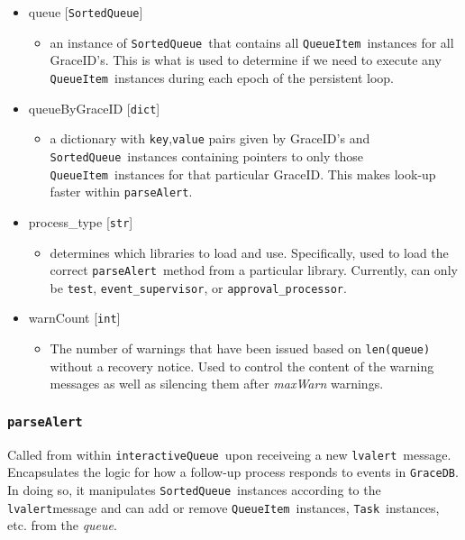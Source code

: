 \documentclass{article}
\newcommand{\GraceDB}{\texttt{GraceDB}}
\newcommand{\alert}{\texttt{lvalert}}
\newcommand{\interactiveQueue}{\texttt{interactiveQueue}}
\newcommand{\parseAlert}{\texttt{parseAlert}}
\newcommand{\SortedQueue}{\texttt{SortedQueue}}
\newcommand{\QueueItem}{\texttt{QueueItem}}
\newcommand{\Task}{\texttt{Task}}
\newcommand{\approvalProcessor}{\texttt{approval\_processor}}
\newcommand{\eventSupervisor}{\texttt{event\_supervisor}}
\newcommand{\pythonint}{\texttt{int}}
\newcommand{\pythonstr}{\texttt{str}}
\newcommand{\pythondict}{\texttt{dict}}
\begin{document}
\begin{itemize}
    \item{queue [\SortedQueue]
        \begin{itemize}
            \item{an instance of \SortedQueue~that contains all \QueueItem~instances for all GraceID's. This is what is used to determine if we need to execute any \QueueItem~instances during each epoch of the persistent loop.}
        \end{itemize}
         }
    \item{queueByGraceID [\pythondict]
        \begin{itemize}
            \item{a dictionary with \texttt{key},\texttt{value} pairs given by GraceID's and \SortedQueue~instances containing pointers to only those \QueueItem~instances for that particular GraceID. This makes look-up faster within \parseAlert.}
        \end{itemize}
         }
    \item{process\_type [\pythonstr]
        \begin{itemize}
            \item{determines which libraries to load and use. Specifically, used to load the correct \parseAlert~method from a particular library. Currently, can only be \texttt{test}, \eventSupervisor, or \approvalProcessor.}
        \end{itemize}
         }
    \item{warnCount [\pythonint]
        \begin{itemize}
            \item{The number of warnings that have been issued based on \texttt{len(queue)} without a recovery notice. Used to control the content of the warning messages as well as silencing them after \textit{maxWarn} warnings.}
        \end{itemize}
         }
\end{itemize}


\subsubsection{\parseAlert}
\label{sec: parseAlert}

Called from within \interactiveQueue~upon receiveing a new \alert~message.
Encapsulates the logic for how a follow-up process responds to events in \GraceDB.
In doing so, it manipulates \SortedQueue~instances according to the \alert message and can add or remove \QueueItem~instances, \Task~instances, etc. from the \textit{queue}.
\end{document}
